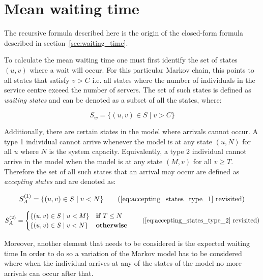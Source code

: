 \section{Mean waiting time}\label{sec:appendix_mean_waiting}

The recursive formula described here is the origin of the closed-form formula 
described in section~\ref{sec:waiting_time}.

To calculate the mean waiting time one must first identify the set of states 
\((u, v)\) where a wait will occur. 
For this particular Markov chain, this points to all states that satisfy 
\(v > C\) i.e. all states where the number of individuals in the service centre 
exceed the number of servers. 
The set of such states is defined as \textit{waiting states} and can be denoted 
as a subset of all the states, where:

\begin{equation} \label{eq:waiting_states}
    S_w = \{(u, v) \in S \; | \; v > C \}    
\end{equation}

Additionally, there are certain states in the model where arrivals cannot occur. 
A type 1 individual cannot arrive whenever the model is at any state 
\((u, N)\) 
for all \(u\) where \(N\) is the system capacity. 
Equivalently, a type 2 individual cannot arrive in the model when the model is 
at any state \((M, v)\) for all \(v \geq T\).
Therefore the set of all such states that an arrival may occur are defined as 
\textit{accepting states} and are denoted as:

\begin{equation*}
    S_A^{(1)} = \{(u, v) \in S \; | \; v < N \}
    \tag{\ref{eq:accepting_states_type_1} revisited}
\end{equation*}

\begin{equation}
    S_A^{(2)}=
    \begin{cases}
        \{(u, v) \in S \; | \; u < M \} & \textbf{if } T \leq N\\
        \{(u, v) \in S \; | \; v < N \} & \textbf{otherwise}
    \end{cases}
    \tag{\ref{eq:accepting_states_type_2} revisited}
\end{equation}

Moreover, another element that needs to be considered is the expected waiting time 
In order to do so a variation of the Markov model has to be considered where when 
the individual arrives at any of the states of the model no more arrivals can 
occur after that. 


